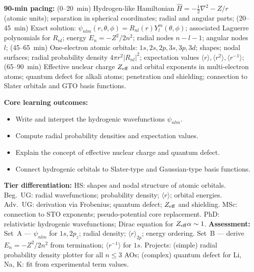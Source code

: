 \documentclass[11pt,a4paper]{article}
\begin{document}
\medskip

\begin{tcolorbox}[chembox, title={Module~III.2 / L02: Hydrogenic Systems}]
\textbf{90-min pacing:} (0--20~min) Hydrogen-like Hamiltonian $\hat{H}=-\tfrac{1}{2}\nabla^2-Z/r$ (atomic units); separation in spherical coordinates; radial and angular parts; (20--45~min) Exact solution: $\psi_{nlm}(r,\theta,\phi)=R_{nl}(r)Y_l^m(\theta,\phi)$; associated Laguerre polynomials for $R_{nl}$; energy $E_n=-Z^2/2n^2$; radial nodes $n-l-1$; angular nodes $l$; (45--65~min) One-electron atomic orbitals: $1s,2s,2p,3s,3p,3d$; shapes; nodal surfaces; radial probability density $4\pi r^2|R_{nl}|^2$; expectation values $\langle r\rangle,\langle r^2\rangle,\langle r^{-1}\rangle$; (65--90~min) Effective nuclear charge $Z_{\rm eff}$ and orbital exponents in multi-electron atoms; quantum defect for alkali atoms; penetration and shielding; connection to Slater orbitals and GTO basis functions.

\medskip\textbf{Core learning outcomes:}
\begin{itemize}[leftmargin=1.4em,topsep=2pt,itemsep=1pt]
  \item Write and interpret the hydrogenic wavefunctions $\psi_{nlm}$.
  \item Compute radial probability densities and expectation values.
  \item Explain the concept of effective nuclear charge and quantum defect.
  \item Connect hydrogenic orbitals to Slater-type and Gaussian-type basis functions.
\end{itemize}
\medskip\textbf{Tier differentiation:}
HS: shapes and nodal structure of atomic orbitals.
Beg.\ UG: radial wavefunctions; probability density; $\langle r\rangle$; orbital energies.
Adv.\ UG: derivation via Frobenius; quantum defect; $Z_{\rm eff}$ and shielding.
MSc: connection to STO exponents; pseudo-potential core replacement.
PhD: relativistic hydrogenic wavefunctions; Dirac equation for $Z_{\rm eff}\alpha\sim1$.
\medskip\textbf{Assessment:}
Set~A --- $\psi_{nlm}$ for $1s,2p_z$; radial density; $\langle r\rangle_{2p}$; energy ordering.
Set~B --- derive $E_n=-Z^2/2n^2$ from termination; $\langle r^{-1}\rangle$ for $1s$.
Projects: (simple) radial probability density plotter for all $n\leq3$ AOs; (complex) quantum defect for Li, Na, K: fit from experimental term values.
\end{tcolorbox}

\medskip
\end{document}
